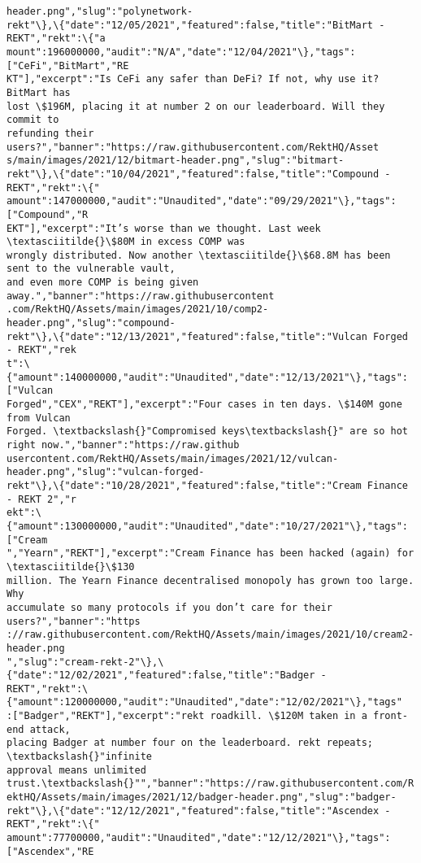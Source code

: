 \documentclass[11pt]{article}
\begin{document}
\begin{Verbatim}[commandchars=\\\{\}]
header.png","slug":"polynetwork-
rekt"\},\{"date":"12/05/2021","featured":false,"title":"BitMart - REKT","rekt":\{"a
mount":196000000,"audit":"N/A","date":"12/04/2021"\},"tags":["CeFi","BitMart","RE
KT"],"excerpt":"Is CeFi any safer than DeFi? If not, why use it? BitMart has
lost \$196M, placing it at number 2 on our leaderboard. Will they commit to
refunding their users?","banner":"https://raw.githubusercontent.com/RektHQ/Asset
s/main/images/2021/12/bitmart-header.png","slug":"bitmart-
rekt"\},\{"date":"10/04/2021","featured":false,"title":"Compound - REKT","rekt":\{"
amount":147000000,"audit":"Unaudited","date":"09/29/2021"\},"tags":["Compound","R
EKT"],"excerpt":"It’s worse than we thought. Last week \textasciitilde{}\$80M in excess COMP was
wrongly distributed. Now another \textasciitilde{}\$68.8M has been sent to the vulnerable vault,
and even more COMP is being given away.","banner":"https://raw.githubusercontent
.com/RektHQ/Assets/main/images/2021/10/comp2-header.png","slug":"compound-
rekt"\},\{"date":"12/13/2021","featured":false,"title":"Vulcan Forged - REKT","rek
t":\{"amount":140000000,"audit":"Unaudited","date":"12/13/2021"\},"tags":["Vulcan
Forged","CEX","REKT"],"excerpt":"Four cases in ten days. \$140M gone from Vulcan
Forged. \textbackslash{}"Compromised keys\textbackslash{}" are so hot right now.","banner":"https://raw.github
usercontent.com/RektHQ/Assets/main/images/2021/12/vulcan-
header.png","slug":"vulcan-forged-
rekt"\},\{"date":"10/28/2021","featured":false,"title":"Cream Finance - REKT 2","r
ekt":\{"amount":130000000,"audit":"Unaudited","date":"10/27/2021"\},"tags":["Cream
","Yearn","REKT"],"excerpt":"Cream Finance has been hacked (again) for \textasciitilde{}\$130
million. The Yearn Finance decentralised monopoly has grown too large. Why
accumulate so many protocols if you don’t care for their users?","banner":"https
://raw.githubusercontent.com/RektHQ/Assets/main/images/2021/10/cream2-header.png
","slug":"cream-rekt-2"\},\{"date":"12/02/2021","featured":false,"title":"Badger -
REKT","rekt":\{"amount":120000000,"audit":"Unaudited","date":"12/02/2021"\},"tags"
:["Badger","REKT"],"excerpt":"rekt roadkill. \$120M taken in a front-end attack,
placing Badger at number four on the leaderboard. rekt repeats; \textbackslash{}"infinite
approval means unlimited trust.\textbackslash{}"","banner":"https://raw.githubusercontent.com/R
ektHQ/Assets/main/images/2021/12/badger-header.png","slug":"badger-
rekt"\},\{"date":"12/12/2021","featured":false,"title":"Ascendex - REKT","rekt":\{"
amount":77700000,"audit":"Unaudited","date":"12/12/2021"\},"tags":["Ascendex","RE

\end{Verbatim}
\end{document}
